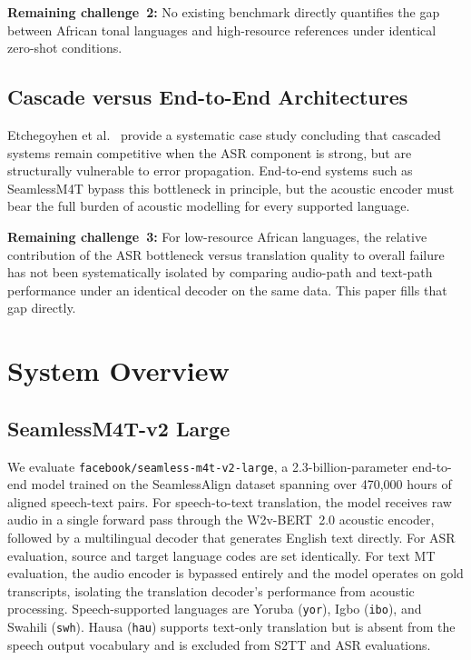 \documentclass[10pt,twocolumn]{article}
\begin{document}
\textbf{Remaining challenge~2:} No existing benchmark directly
quantifies the gap between African tonal languages and
high-resource references under identical zero-shot conditions.

\subsection{Cascade versus End-to-End Architectures}

Etchegoyhen et al.~\cite{etchegoyhen2022cascade} provide a
systematic case study concluding that cascaded systems remain
competitive when the ASR component is strong, but are
structurally vulnerable to error propagation.
End-to-end systems such as SeamlessM4T bypass this bottleneck
in principle, but the acoustic encoder must bear the full burden
of acoustic modelling for every supported language.

\textbf{Remaining challenge~3:} For low-resource African languages,
the relative contribution of the ASR bottleneck versus translation
quality to overall failure has not been systematically isolated
by comparing audio-path and text-path performance under an
identical decoder on the same data.
This paper fills that gap directly.

\section{System Overview}

\subsection{SeamlessM4T-v2 Large}

We evaluate \texttt{facebook/seamless-m4t-v2-large}, a
2.3-billion-parameter end-to-end model trained on the
SeamlessAlign dataset spanning over 470,000 hours of aligned
speech-text pairs.
For speech-to-text translation, the model receives raw audio
in a single forward pass through the W2v-BERT~2.0 acoustic
encoder, followed by a multilingual decoder that generates
English text directly.
For ASR evaluation, source and target language codes are set
identically.
For text MT evaluation, the audio encoder is bypassed entirely
and the model operates on gold transcripts, isolating the
translation decoder's performance from acoustic processing.
Speech-supported languages are Yoruba (\texttt{yor}),
Igbo (\texttt{ibo}), and Swahili (\texttt{swh}).
Hausa (\texttt{hau}) supports text-only translation but is
absent from the speech output vocabulary and is excluded from
S2TT and ASR evaluations.
\end{document}
